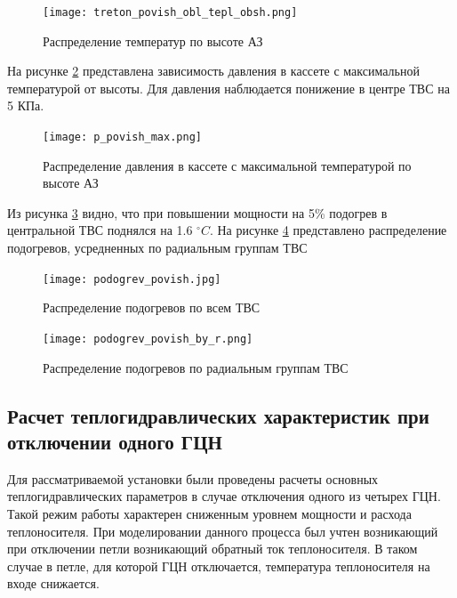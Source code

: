 \begin{figure}[H]
	\begin{center}
		\texttt{[image: treton\_povish\_obl\_tepl\_obsh.png]}
		\caption{Распределение температур по высоте АЗ}
		\label{pic:treton-povish-obl-tepl-obsh} %
	\end{center}
\end{figure}


На рисунке \ref{pic:p-povish-max} представлена зависимость давления в кассете с максимальной температурой от высоты. Для давления наблюдается понижение в центре ТВС на 5 КПа. 


\begin{figure}[H]
	\begin{center}
		\texttt{[image: p\_povish\_max.png]}
		\caption{Распределение давления в кассете с максимальной температурой по высоте АЗ}
		\label{pic:p-povish-max} %
	\end{center}
\end{figure}

Из рисунка \ref{pic:podogrev-povish} видно, что при повышении мощности на 5\% подогрев в центральной ТВС поднялся на 1.6 $^\circ C$. На рисунке \ref{pic:podogrev-povish-by-r} представлено распределение подогревов, усредненных по радиальным группам ТВС


\begin{figure}[H]
	\begin{center}
		\texttt{[image: podogrev\_povish.jpg]}
		\caption{Распределение подогревов по всем ТВС}
		\label{pic:podogrev-povish} %
	\end{center}
\end{figure}

\begin{figure}[H]
	\begin{center}
		\texttt{[image: podogrev\_povish\_by\_r.png]}
		\caption{Распределение подогревов по радиальным группам ТВС}
		\label{pic:podogrev-povish-by-r} %
	\end{center}
\end{figure}


\subsection{Расчет теплогидравлических характеристик при отключении одного ГЦН}
Для рассматриваемой установки были проведены расчеты основных теплогидравлических параметров в случае отключения одного из четырех ГЦН. Такой режим работы характерен сниженным уровнем мощности и расхода теплоносителя. При моделировании данного процесса был учтен возникающий при отключении петли возникающий обратный ток теплоносителя. В таком случае в петле, для которой ГЦН отключается, температура теплоносителя на входе снижается. 

